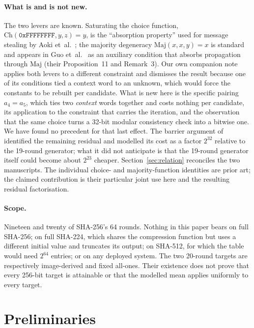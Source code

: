 \documentclass[11pt,a4paper]{article}
\newcommand{\Maj}{\mathrm{Maj}}
\newcommand{\Ch}{\mathrm{Ch}}
\newcommand{\hex}[1]{\texttt{#1}}
\begin{document}
\paragraph{What is and is not new.}
The two levers are known.  Saturating the choice function,
$\Ch(\hex{0xFFFFFFFF},y,z)=y$, is the ``absorption property'' used for message
stealing by Aoki et~al.~\cite{AokiGuo2009}; the majority degeneracy
$\Maj(x,x,y)=x$ is standard and appears in Guo
et~al.~\cite{GuoLiLiuWangZhang2026} as an auxiliary condition that absorbs
propagation through $\Maj$ (their Proposition~11 and Remark~3).  Our own companion
note~\cite{Basra2026R20} applies both levers to a different constraint and
dismisses the result because one of its conditions tied a context word to an
unknown, which would force the constants to be rebuilt per candidate.  What is
new here is the specific pairing $a_4=a_5$, which ties two \emph{context}
words together and costs nothing per candidate, its application to the
constraint that carries the iteration, and the observation that the same
choice turns a 32-bit modular consistency check into a bitwise one.  We have
found no precedent for that last effect.  The barrier argument
of~\cite{Basra2026R20} identified the remaining residual and modelled its
cost as a factor $2^{32}$ relative to the 19-round generator; what it did not
anticipate is that the 19-round generator itself could become about $2^{23}$
cheaper.
Section~\ref{sec:relation} reconciles the two manuscripts.  The individual
choice- and majority-function identities are prior art; the claimed
contribution is their particular joint use here and the resulting residual
factorisation.

\paragraph{Scope.}
Nineteen and twenty of SHA-256's 64 rounds.  Nothing in this paper bears on
full SHA-256; on full SHA-224, which shares the compression function but uses
a different initial value and truncates its output; on SHA-512, for which the
table would need $2^{64}$ entries; or on any deployed system.  The two
20-round targets are respectively image-derived and fixed all-ones.  Their
existence does not prove that every 256-bit target is attainable or that the
modelled mean applies uniformly to every target.

\section{Preliminaries}
\label{sec:prelim}
\end{document}
